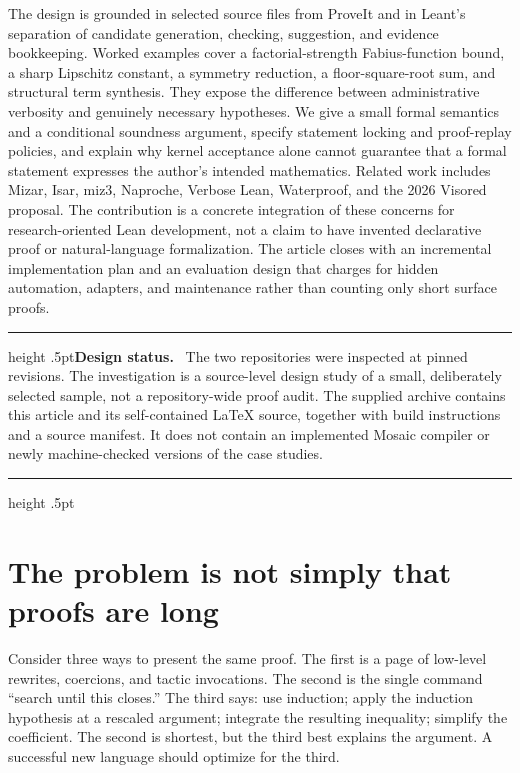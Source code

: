 \documentclass[11pt,a4paper]{article}
\theoremstyle{definition}
\theoremstyle{remark}
\newenvironment{designnote}{\par\medskip\noindent\begin{minipage}{\linewidth}\hrule height .5pt\medskip\small\noindent\textbf{Design status.}\ }{\par\medskip\hrule height .5pt\end{minipage}\par\medskip}
\begin{document}
The design is grounded in selected source files from ProveIt and in Leant's separation of candidate generation, checking, suggestion, and evidence bookkeeping. Worked examples cover a factorial-strength Fabius-function bound, a sharp Lipschitz constant, a symmetry reduction, a floor-square-root sum, and structural term synthesis. They expose the difference between administrative verbosity and genuinely necessary hypotheses. We give a small formal semantics and a conditional soundness argument, specify statement locking and proof-replay policies, and explain why kernel acceptance alone cannot guarantee that a formal statement expresses the author's intended mathematics. Related work includes Mizar, Isar, miz3, Naproche, Verbose Lean, Waterproof, and the 2026 Visored proposal. The contribution is a concrete integration of these concerns for research-oriented Lean development, not a claim to have invented declarative proof or natural-language formalization. The article closes with an incremental implementation plan and an evaluation design that charges for hidden automation, adapters, and maintenance rather than counting only short surface proofs.

\begin{designnote}
The two repositories were inspected at pinned revisions. The investigation is a source-level design study of a small, deliberately selected sample, not a repository-wide proof audit. The supplied archive contains this article and its self-contained LaTeX source, together with build instructions and a source manifest. It does not contain an implemented Mosaic compiler or newly machine-checked versions of the case studies.
\end{designnote}
\clearpage
\begingroup
\small
\tableofcontents
\endgroup
\clearpage
{}

\section{The problem is not simply that proofs are long}
\label{sec:problem}
Consider three ways to present the same proof. The first is a page of low-level rewrites, coercions, and tactic invocations. The second is the single command ``search until this closes.'' The third says: use induction; apply the induction hypothesis at a rescaled argument; integrate the resulting inequality; simplify the coefficient. The second is shortest, but the third best explains the argument. A successful new language should optimize for the third.
\end{document}
